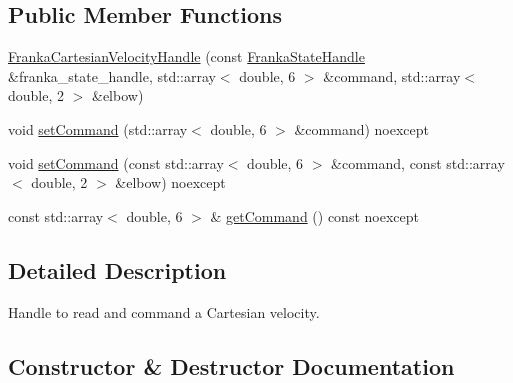 \subsection*{Public Member Functions}
\begin{DoxyCompactItemize}
\item 
\hyperlink{classfranka__hw_1_1_franka_cartesian_velocity_handle_ab58f21f67fbba0bc10a2e32e98c3e5ef}{Franka\+Cartesian\+Velocity\+Handle} (const \hyperlink{classfranka__hw_1_1_franka_state_handle}{Franka\+State\+Handle} \&franka\+\_\+state\+\_\+handle, std\+::array$<$ double, 6 $>$ \&command, std\+::array$<$ double, 2 $>$ \&elbow)
\item 
void \hyperlink{classfranka__hw_1_1_franka_cartesian_velocity_handle_a8087142ef5b8fedeae8930f01dfd4a07}{set\+Command} (std\+::array$<$ double, 6 $>$ \&command) noexcept
\item 
void \hyperlink{classfranka__hw_1_1_franka_cartesian_velocity_handle_aaf139dd23a7d9784a7cc74c6eaca4b9c}{set\+Command} (const std\+::array$<$ double, 6 $>$ \&command, const std\+::array$<$ double, 2 $>$ \&elbow) noexcept
\item 
const std\+::array$<$ double, 6 $>$ \& \hyperlink{classfranka__hw_1_1_franka_cartesian_velocity_handle_a64a89a403d36122a8ea553600ea94894}{get\+Command} () const noexcept
\end{DoxyCompactItemize}


\subsection{Detailed Description}
Handle to read and command a Cartesian velocity. 

\subsection{Constructor \& Destructor Documentation}
\mbox{\label{classfranka__hw_1_1_franka_cartesian_velocity_handle_ab58f21f67fbba0bc10a2e32e98c3e5ef}} 
